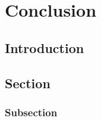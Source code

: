 \chapter{Conclusion}

\section{Introduction}

\lipsum[1-4]

\section{Section}

\lipsum[2-4]

\subsection{Subsection}

\lipsum[2-4]